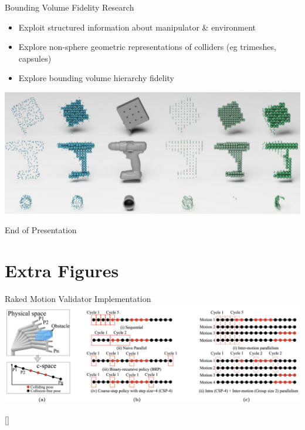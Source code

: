 \documentclass{beamer}
\newcommand{\todo}[1]{\textit{\textcolor{red}{#1}}}
\begin{document}
\begin{frame}{Bounding Volume Fidelity Research}
\begin{itemize}
\item Exploit structured information about manipulator \& environment
\item Explore non-sphere geometric representations of colliders (eg trimeshes, capsules)
\item Explore bounding volume hierarchy fidelity
\end{itemize}
\centering
\includegraphics[height=0.37\textheight]{./assets/geom_fidelity.png}
\end{frame}

%

\begin{frame}{End of Presentation}
\end{frame}

\section{Extra Figures}

\begin{frame}{Raked Motion Validator Implementation}
\includegraphics[width=\textwidth]{./assets/eemp_mv.png}

[\cite{paper:eemp}]
\end{frame}
\end{document}
